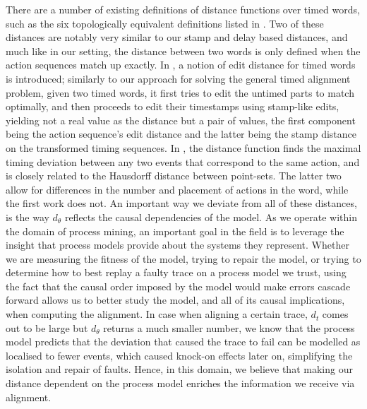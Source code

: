 \documentclass[conference]{IEEEtran}
\begin{document}
		There are a number of existing definitions of distance functions over timed words, such as the six topologically equivalent definitions listed in \cite{alldistHenz}. 
		Two of these distances are notably very similar to our stamp and delay based distances, and much like in our setting, the distance between two words is only defined when the action sequences match up exactly. 
		In \cite{CIM14}, a notion of edit distance for timed words is introduced; similarly to our approach for solving the general timed alignment problem, given two timed words, it first tries to edit the untimed parts to match optimally, and then proceeds to edit their timestamps using stamp-like edits, yielding not a real value as the distance but a pair of values, the first component being the action sequence's edit distance and the latter being the stamp distance on the transformed timing sequences. 
		In \cite{ABD18}, the distance function finds the maximal timing deviation between any two events that correspond to the same action, and is closely related to the Hausdorff distance between point-sets. 
		The latter two allow for differences in the number and placement of actions in the word, while the first work does not. 
		An important way we deviate from all of these distances, is the way $d_{\theta}$ reflects the causal dependencies of the model. 
		As we operate within the domain of process mining, an important goal in the field is to leverage the insight that process models provide about the systems they represent. 
		Whether we are measuring the fitness of the model, trying to repair the model, or trying to determine how to best replay a faulty trace on a process model we trust, using the fact that the causal order imposed by the model would make errors cascade forward allows us to better study the model, and all of its causal implications, when computing the alignment. 
		In case when aligning a certain trace, $d_t$ comes out to be large but $d_{\theta}$ returns a much smaller number, we know that the process model predicts that the deviation that caused the trace to fail can be modelled as localised to fewer events, which caused knock-on effects later on, simplifying the isolation and repair of faults. 
		Hence, in this domain, we believe that making our distance dependent on the process model enriches the information we receive via alignment. 
\end{document}
